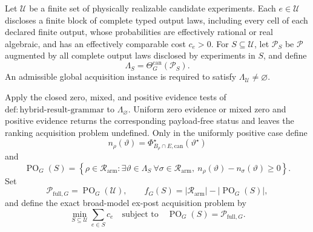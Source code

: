Let \(\mathcal U\) be a finite set of physically realizable candidate experiments.  Each \(e\in\mathcal U\) discloses a finite block of complete typed output laws, including every cell of each declared finite output, whose probabilities are effectively rational or real algebraic, and has an effectively comparable cost \(c_e>0\).  For \(S\subseteq\mathcal U\), let \(\mathcal P_S\) be \(\mathcal P\) augmented by all complete output laws disclosed by experiments in \(S\), and define
\[
\Lambda_S=\Theta_G^{\mathrm{can}}(\mathcal P_S).
\]
An admissible global acquisition instance is required to satisfy \(\Lambda_{\mathcal U}\ne\varnothing\).

Apply the closed zero, mixed, and positive evidence tests of \(\mathrm{def:hybrid\text{-}result\text{-}grammar}\) to \(\Lambda_{\varnothing}\).  Uniform zero evidence or mixed zero and positive evidence returns the corresponding payload-free status and leaves the ranking acquisition problem undefined.  Only in the uniformly positive case define
\[
n_\rho(\vartheta)
=\Phi_{B_\rho\cap E,\mathrm{can}}^\star(\vartheta^\star)
\]
and
\[
\operatorname{PO}_G(S)
=\left\{\rho\in\mathcal R_{\mathrm{arm}}:
\exists\vartheta\in\Lambda_S\ \forall\sigma\in\mathcal R_{\mathrm{arm}},\ 
n_\rho(\vartheta)-n_\sigma(\vartheta)\geq0\right\}.
\]
Set
\[
\mathcal P_{\mathrm{full},G}=\operatorname{PO}_G(\mathcal U),
\qquad
f_G(S)=|\mathcal R_{\mathrm{arm}}|-|\operatorname{PO}_G(S)|,
\]
and define the exact broad-model ex-post acquisition problem by
\[
\min_{S\subseteq\mathcal U}\sum_{e\in S}c_e
\quad\text{subject to}\quad
\operatorname{PO}_G(S)=\mathcal P_{\mathrm{full},G}.
\]